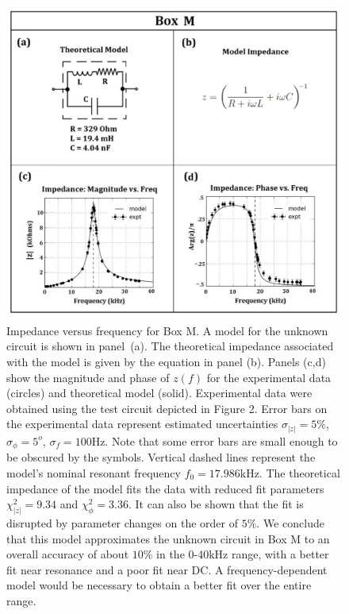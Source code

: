 \documentclass[11pt]{article}
\begin{document}
\begin{figure}[t]
\centering
\includegraphics[scale=.5]{boxM.png}
\caption{Impedance versus frequency for Box M. A model for the unknown circuit is shown in \mbox{panel (a)}. The theoretical impedance associated with the model is given by the equation in panel (b). Panels (c,d) show the magnitude and phase of $z(f)$ for the experimental data (circles) and theoretical model (solid). Experimental data were obtained using the test circuit depicted in Figure 2. Error bars on the experimental data represent estimated uncertainties $\sigma_{|z|}=5\%$, $\sigma_{\phi}=5^{o}$, $\sigma_f = 100$Hz. Note that some error bars are small enough to be obscured by the symbols. Vertical dashed lines represent the model's nominal resonant frequency $f_0=17.986$kHz. The theoretical impedance of the model fits the data with reduced fit parameters $\chi^2_{|z|} = 9.34$ and $\chi^2_{\phi}=3.36$. It can also be shown that the fit is disrupted by parameter changes on the order of $5\%$. We conclude that this model approximates the unknown circuit in Box M to an overall accuracy of about $10\%$ in the 0-40kHz range, with a better fit near resonance and a poor fit near DC. A frequency-dependent model would be necessary to obtain a better fit over the entire range.}
\end{figure}



\clearpage
\end{document}
